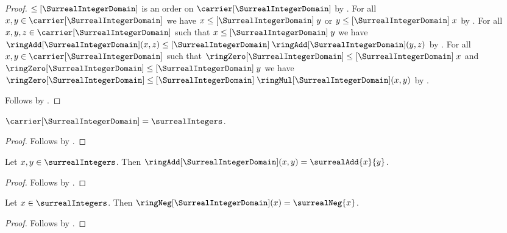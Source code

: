 \begin{proof}
    $\leq[\SurrealIntegerDomain]$ is an order on
        $\carrier[\SurrealIntegerDomain]$
        by .
    For all $x,y\in\carrier[\SurrealIntegerDomain]$ we have
        $x\mathrel{\leq[\SurrealIntegerDomain]}y$ or
        $y\mathrel{\leq[\SurrealIntegerDomain]}x$
        by .
    For all $x,y,z\in\carrier[\SurrealIntegerDomain]$ such that
        $x\mathrel{\leq[\SurrealIntegerDomain]}y$ we have
        $\ringAdd[\SurrealIntegerDomain](x,z)
            \mathrel{\leq[\SurrealIntegerDomain]}
        \ringAdd[\SurrealIntegerDomain](y,z)$
        by .
    For all $x,y\in\carrier[\SurrealIntegerDomain]$ such that
        $\ringZero[\SurrealIntegerDomain]
            \mathrel{\leq[\SurrealIntegerDomain]}x$ and
        $\ringZero[\SurrealIntegerDomain]
            \mathrel{\leq[\SurrealIntegerDomain]}y$ we have
        $\ringZero[\SurrealIntegerDomain]
            \mathrel{\leq[\SurrealIntegerDomain]}
        \ringMul[\SurrealIntegerDomain](x,y)$
        by .

    Follows by .
\end{proof}

\begin{proposition}\label{surreal_integer_domain_carrier}
    $\carrier[\SurrealIntegerDomain]=\surrealIntegers$.
\end{proposition}
\begin{proof}
    Follows by
    .
\end{proof}

\begin{proposition}\label{surreal_integer_domain_addition}
    Let $x,y\in\surrealIntegers$.
    Then
        $\ringAdd[\SurrealIntegerDomain](x,y)=\surrealAdd{x}{y}$.
\end{proposition}
\begin{proof}
    Follows by
    .
\end{proof}

\begin{proposition}\label{surreal_integer_domain_negation}
    Let $x\in\surrealIntegers$.
    Then $\ringNeg[\SurrealIntegerDomain](x)=\surrealNeg{x}$.
\end{proposition}
\begin{proof}
    Follows by
    .
\end{proof}

